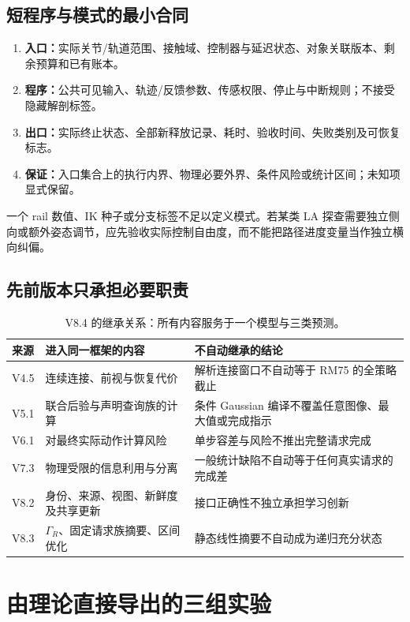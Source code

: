 \documentclass[11pt,a4paper,fontset=fandol]{ctexart}
\theoremstyle{definition}
\theoremstyle{remark}
\numberwithin{equation}{section}
\begin{document}
\subsection{短程序与模式的最小合同}
\begin{enumerate}
\item \textbf{入口：}实际关节/轨道范围、接触域、控制器与延迟状态、对象关联版本、剩余预算和已有账本。
\item \textbf{程序：}公共可见输入、轨迹/反馈参数、传感权限、停止与中断规则；不接受隐藏解剖标签。
\item \textbf{出口：}实际终止状态、全部新释放记录、耗时、验收时间、失败类别及可恢复标志。
\item \textbf{保证：}入口集合上的执行内界、物理必要外界、条件风险或统计区间；未知项显式保留。
\end{enumerate}
一个 rail 数值、IK 种子或分支标签不足以定义模式。若某类 LA 探查需要独立侧向或额外姿态调节，应先验收实际控制自由度，而不能把路径进度变量当作独立横向纠偏。

\subsection{先前版本只承担必要职责}
\begin{table}[htbp]\centering\small
\begin{tabularx}{\linewidth}{P{.12\linewidth}YY}
\toprule
来源 & 进入同一框架的内容 & 不自动继承的结论\\\midrule
V4.5 & 连续连接、前视与恢复代价 & 解析连接窗口不自动等于 RM75 的全策略截止\\
V5.1 & 联合后验与声明查询族的计算 & 条件 Gaussian 编译不覆盖任意图像、最大值或完成指示\\
V6.1 & 对最终实际动作计算风险 & 单步容差与风险不推出完整请求完成\\
V7.3 & 物理受限的信息利用与分离 & 一般统计缺陷不自动等于任何真实请求的完成差\\
V8.2 & 身份、来源、视图、新鲜度及共享更新 & 接口正确性不独立承担学习创新\\
V8.3 & $\Gamma_R$、固定请求族摘要、区间优化 & 静态线性摘要不自动成为递归充分状态\\
\bottomrule
\end{tabularx}
\caption{V8.4 的继承关系：所有内容服务于一个模型与三类预测。}
\end{table}

\section{由理论直接导出的三组实验}
\label{sec:experiments}
\end{document}

